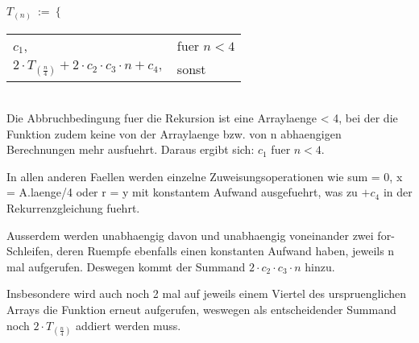 $T_(n)\ :=\ \bigg\{$
\begin{tabular}{ll}
$c_1$, &fuer $n < 4$\\
$2 \cdot T_(\frac{n}{4}) + 2 \cdot c_2 \cdot c_3 \cdot n + c_4,$ &sonst
\end{tabular}\\


Die Abbruchbedingung fuer die Rekursion ist eine Arraylaenge < 4, bei der die Funktion zudem keine von der Arraylaenge bzw. von n abhaengigen Berechnungen mehr ausfuehrt. Daraus ergibt sich: $c_1$ fuer $n < 4$.

In allen anderen Faellen werden einzelne Zuweisungsoperationen wie sum = 0, x = A.laenge/4 oder r = y mit konstantem Aufwand ausgefuehrt, was zu $+ c_4$ in der Rekurrenzgleichung fuehrt.

Ausserdem werden unabhaengig davon und unabhaengig voneinander zwei for-Schleifen, deren Ruempfe ebenfalls einen konstanten Aufwand haben, jeweils n mal aufgerufen. Deswegen kommt der Summand $2 \cdot c_2 \cdot c_3 \cdot n$ hinzu.

Insbesondere wird auch noch 2 mal auf jeweils einem Viertel des urspruenglichen Arrays die Funktion erneut aufgerufen, weswegen als entscheidender Summand noch $2 \cdot T_(\frac{n}{4})$ addiert werden muss.
